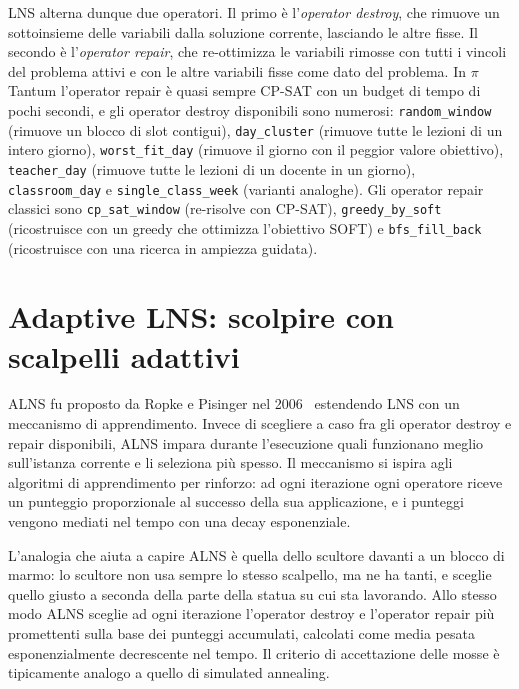 LNS alterna dunque due operatori. Il primo \`e
l'\emph{operator destroy}, che rimuove un sottoinsieme delle
variabili dalla soluzione corrente, lasciando le altre
fisse. Il secondo \`e l'\emph{operator repair}, che
re-ottimizza le variabili rimosse con tutti i vincoli del
problema attivi e con le altre variabili fisse come dato
del problema. In $\pi$Tantum l'operator repair \`e quasi
sempre CP-SAT con un budget di tempo di pochi secondi, e gli
operator destroy disponibili sono numerosi:
\texttt{random\_window} (rimuove un blocco di slot
contigui), \texttt{day\_cluster} (rimuove tutte le lezioni
di un intero giorno), \texttt{worst\_fit\_day} (rimuove il
giorno con il peggior valore obiettivo),
\texttt{teacher\_day} (rimuove tutte le lezioni di un
docente in un giorno), \texttt{classroom\_day} e
\texttt{single\_class\_week} (varianti analoghe). Gli
operator repair classici sono \texttt{cp\_sat\_window}
(re-risolve con CP-SAT), \texttt{greedy\_by\_soft} (ricostruisce
con un greedy che ottimizza l'obiettivo SOFT) e
\texttt{bfs\_fill\_back} (ricostruisce con una ricerca in
ampiezza guidata).

\section{Adaptive LNS: scolpire con scalpelli adattivi}

\begin{storiabox}
ALNS fu proposto da Ropke e Pisinger nel
2006~\parencite{ropke2006} estendendo LNS con un meccanismo
di apprendimento. Invece di scegliere a caso fra gli
operator destroy e repair disponibili, ALNS impara durante
l'esecuzione quali funzionano meglio sull'istanza corrente
e li seleziona pi\`u spesso. Il meccanismo si ispira agli
algoritmi di apprendimento per rinforzo: ad ogni iterazione
ogni operatore riceve un punteggio proporzionale al successo
della sua applicazione, e i punteggi vengono mediati nel
tempo con una decay esponenziale.
\end{storiabox}

L'analogia che aiuta a capire ALNS \`e quella dello
scultore davanti a un blocco di marmo: lo scultore non
usa sempre lo stesso scalpello, ma ne ha tanti, e sceglie
quello giusto a seconda della parte della statua su cui sta
lavorando. Allo stesso modo ALNS sceglie ad ogni iterazione
l'operator destroy e l'operator repair pi\`u promettenti
sulla base dei punteggi accumulati, calcolati come media
pesata esponenzialmente decrescente nel tempo. Il criterio
di accettazione delle mosse \`e tipicamente analogo a quello
di simulated annealing.

